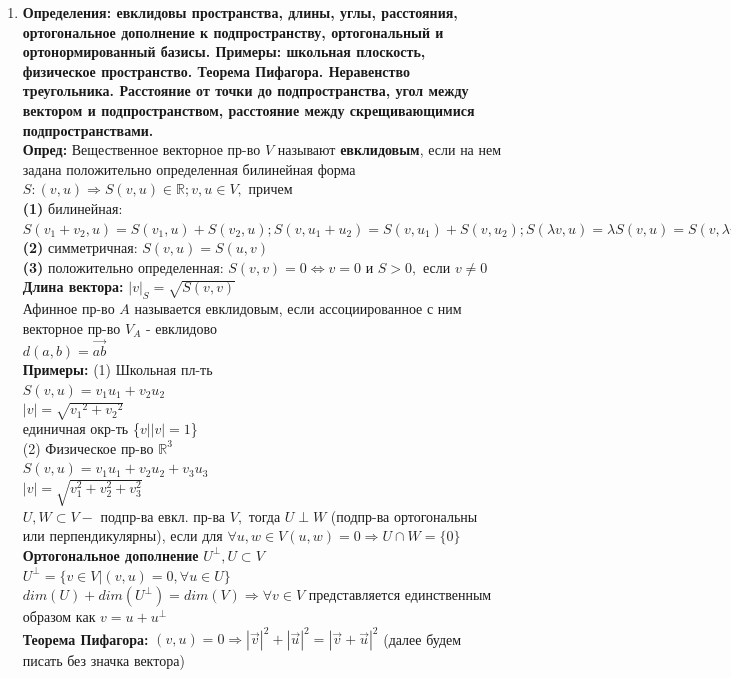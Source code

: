 \documentclass[12pt, oneside]{book}
\theoremstyle{definition}
\newcommand{\textdf}[1]{\textbf{\textsf{#1}}\index{#1}}
\begin{document}
\begin{enumerate}
\item \textbf{Определения: евклидовы пространства, длины, углы, расстояния, ортогональное дополнение к подпространству, ортогональный и ортонормированный базисы. Примеры: школьная плоскость, физическое пространство. Теорема Пифагора. Неравенство треугольника. Расстояние от точки до подпространства, угол между вектором и подпространством, расстояние между скрещивающимися подпространствами.}\\

\textdf{Опред:} Вещественное векторное пр-во $V$ называют \textdf{евклидовым}, если на нем задана положительно определенная билинейная форма $S: (v,u) \Longrightarrow S(v,u) \in \mathbb{R}; v,u \in V,$ причем\\
\textbf{(1)} билинейная: $S(v_1+v_2,u)=S(v_1,u)+S(v_2,u); S(v,u_1+u_2)=S(v,u_1)+S(v,u_2); S(\lambda v,u)=\lambda S(v,u)=S(v,\lambda u)$\\
\textbf{(2)} симметричная: $S(v,u)=S(u,v)$\\
\textbf{(3)} положительно определенная: $S(v,v)=0 \Leftrightarrow v=0$ и $S>0,$ если $v \neq 0$\\
\textbf{Длина вектора:} $|v|_S=\sqrt{S(v,v)}$\\
Афинное пр-во $A$ называется евклидовым, если ассоциированное с ним векторное пр-во $V_A$ - евклидово\\
$d(a,b)=\overrightarrow{ab}$\\
\textbf{Примеры:} (1) Школьная пл-ть\\
$S(v,u)=v_1u_1+v_2u_2$\\
$|v|=\sqrt{{v_1}^2+{v_2}^2}$\\
единичная окр-ть \{$v | |v|=1$\}\\
(2) Физическое пр-во $\mathbb{R}^3$\\
$S(v,u)=v_1u_1+v_2u_2+v_3u_3$\\
$|v|=\sqrt{v^2_1+v^2_2+v^2_3}$\\
$U,W \subset V -$ подпр-ва евкл. пр-ва $V,$ тогда $U \perp W$ (подпр-ва ортогональны или перпендикулярны), если для $\forall u,w \in V (u,w)=0 \Longrightarrow U \cap W=\{0\}$\\
\textbf{Ортогональное дополнение} $U^{\perp}, U \subset V$\\
$U^{\perp}=\{v \in V| (v,u)=0, \forall u \in U\}$\\
$dim(U)+dim(U^{\perp})=dim(V) \Longrightarrow \forall v \in V$ представляется единственным образом как $v=u+u^{\perp}$\\
\textbf{Теорема Пифагора:} $(v,u)=0 \Longrightarrow |\overrightarrow v|^2+|\overrightarrow u|^2=|\overrightarrow v + \overrightarrow u|^2$ (далее будем писать без значка вектора)\\

\end{enumerate}
\end{document}
